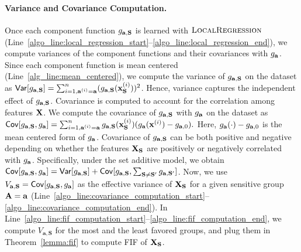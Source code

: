 \paragraph{Variance and Covariance Computation.} Once each component function $ g_{\mathbf{a}, \mathbf{S}} $ is learned with $ \textsc{LocalRegression} $ (Line~\ref{algo_line:local_regression_start}--\ref{algo_line:local_regression_end}), we compute variances of the component functions and their covariances with $ g_{\mathbf{a}} $. Since each component function is mean centered (Line~\ref{alg_line:mean_centered}), we compute the variance of $ g_{\mathbf{a}, \mathbf{S}} $ on the dataset as
$  \mathsf{Var}[g_{\mathbf{a}, \mathbf{S}}] = \sum_{i=1, \mathbf{a}^{(i)} = \mathbf{a}}^n (g_{\mathbf{a}, \mathbf{S}}(\mathbf{x}_{\mathbf{S}}^{(i)}))^2 $. Hence, variance captures the independent effect of $ g_{\mathbf{a}, \mathbf{S}} $.
Covariance is computed to account for the correlation among features $ \mathbf{X} $. We compute the covariance of $ g_{\mathbf{a}, \mathbf{S}} $ with $ g_{\mathbf{a}} $ on the dataset as
$
\label{eq:covariance_computation}
	 \mathsf{Cov}[g_{\mathbf{a}, \mathbf{S}}, g_{\mathbf{a}}] = \sum_{i=1, \mathbf{a}^{(i)} = \mathbf{a}}^n g_{\mathbf{a}, \mathbf{S}}(\mathbf{x}_{\mathbf{S}}^{(i)})(g_\mathbf{a}(\mathbf{x}^{(i)}) - g_{\mathbf{a}, 0}). 
$
Here, $ g_\mathbf{a}(\cdot) - g_{\mathbf{a}, 0} $ is the mean centered form of $ g_{\mathbf{a}} $. Covariance of $ g_{\mathbf{a}, \mathbf{S}} $ can be both positive and negative depending on whether the features $ \mathbf{X}_{\mathbf{S}} $ are positively or negatively correlated with $ g_{\mathbf{a}} $. Specifically, under the set additive model, we obtain $ \mathsf{Cov}[g_{\mathbf{a}, \mathbf{S}}, g_{\mathbf{a}}] = \mathsf{Var}[g_{\mathbf{a}, \mathbf{S}}] + \mathsf{Cov}[g_{\mathbf{a}, \mathbf{S}}, \sum_{\mathbf{S} \ne \mathbf{S}'} g_{\mathbf{a}, \mathbf{S}'}] $. Now, we use $ V_{\mathbf{a}, \mathbf{S}} =  \mathsf{Cov}[g_{\mathbf{a}, \mathbf{S}}, g_{\mathbf{a}}] $ as the effective variance of $ \mathbf{X}_{\mathbf{S}} $ for a given sensitive group $ \mathbf{A} = \mathbf{a} $ (Line~\ref{algo_line:covariance_computation_start}--\ref{algo_line:covariance_computation_end}). In Line~\ref{algo_line:fif_computation_start}--\ref{algo_line:fif_computation_end}, we compute $ V_{\mathbf{a}, \mathbf{S}} $ for the most and the least favored groups, and plug them in Theorem~\ref{lemma:fif} to compute FIF of $ \mathbf{X}_{\mathbf{S}} $.
 
